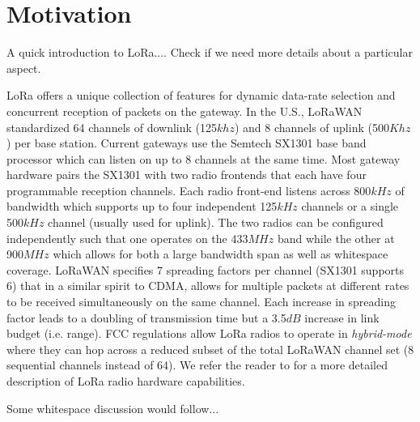 \section{Motivation}
\label{sec:net-scale}

{\color{blue} A quick introduction to LoRa.... Check if we need more details about a particular aspect.}

LoRa offers a unique collection of features for dynamic data-rate selection and concurrent reception of packets on the gateway. In the U.S., LoRaWAN standardized 64 channels of downlink (125$khz$) and 8 channels of uplink (500$Khz$) per base station. Current gateways use the Semtech SX1301 base band processor which can listen on up to 8 channels at the same time. Most gateway hardware pairs the SX1301 with two radio frontends that each have four programmable reception channels. Each radio front-end listens across 800$kHz$ of bandwidth which supports up to four independent 125$kHz$ channels or a single 500$kHz$ channel (usually used for uplink).  The two radios can be configured independently such that one operates on the 433$MHz$ band while the other at 900$MHz$ which allows for both a large bandwidth span as well as whitespace coverage.  LoRaWAN specifies 7 spreading factors per channel (SX1301 supports 6) that in a similar spirit to CDMA, allows for multiple packets at different rates to be received simultaneously on the same channel.  Each increase in spreading factor leads to a doubling of transmission time but a 3.5$dB$ increase in link budget (i.e. range).  FCC regulations allow LoRa radios to operate in {\em hybrid-mode} where they can hop across a reduced subset of the total LoRaWAN channel set (8 sequential channels instead of 64). We refer the reader to \cite{sx1301} for a more detailed description of LoRa radio hardware capabilities.

{\color{blue} Some whitespace discussion would follow...}


